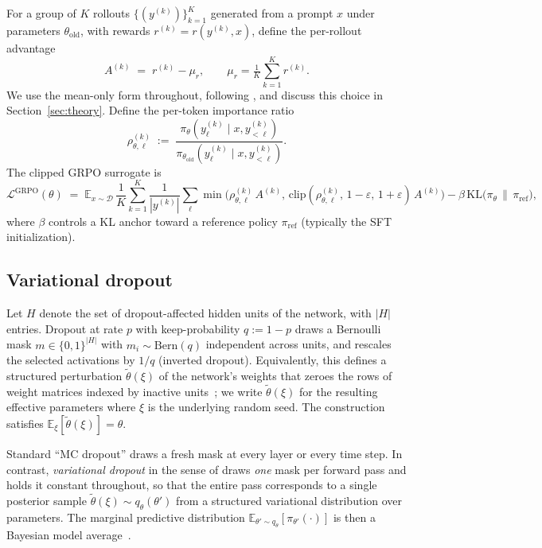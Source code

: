 \documentclass[11pt]{article}
\theoremstyle{definition}
\theoremstyle{remark}
\newcommand{\E}{\mathbb{E}}
\newcommand{\KL}{\mathrm{KL}}
\newcommand{\D}{\mathcal{D}}
\newcommand{\Loss}{\mathcal{L}}
\newcommand{\eps}{\varepsilon}
\newcommand{\old}{\mathrm{old}}
\begin{document}
For a group of $K$ rollouts $\{(y^{(k)})\}_{k=1}^K$ generated from a
prompt $x$ under parameters $\theta_\old$, with rewards
$r^{(k)} = r(y^{(k)}, x)$, define the per-rollout
advantage
\begin{equation}
A^{(k)} \;=\; r^{(k)} - \mu_r,
\qquad
\mu_r = \tfrac{1}{K}\sum_{k=1}^K r^{(k)}.
\label{eq:prelim-advantage}
\end{equation}
We use the mean-only form throughout, following
\citet{liu2024drgrpo}, and discuss this choice in
Section~\ref{sec:theory}.  Define the per-token importance ratio
\begin{equation}
\rho_{\theta,\ell}^{(k)}
   \;:=\;
\frac{\pi_\theta(y_\ell^{(k)} \mid x, y_{<\ell}^{(k)})}
     {\pi_{\theta_\old}(y_\ell^{(k)} \mid x, y_{<\ell}^{(k)})}.
\end{equation}
The clipped GRPO surrogate is
\begin{equation}
\Loss^{\mathrm{GRPO}}(\theta)
  \;=\;
\E_{x \sim \D}\,
\frac{1}{K}\sum_{k=1}^K \frac{1}{|y^{(k)}|} \sum_\ell
   \min\!\Big(
      \rho_{\theta,\ell}^{(k)}\, A^{(k)},\,
      \mathrm{clip}(\rho_{\theta,\ell}^{(k)},\,1-\eps,\,1+\eps)\,A^{(k)}
   \Big)
   - \beta\,\KL\!\big(\pi_\theta\,\big\|\,\pi_{\mathrm{ref}}\big),
\label{eq:prelim-grpo-loss}
\end{equation}
where $\beta$ controls a KL anchor toward a reference policy
$\pi_{\mathrm{ref}}$ (typically the SFT initialization).

\subsection{Variational dropout}
\label{sec:prelim-vdropout}

Let $H$ denote the set of dropout-affected hidden units of the
network, with $|H|$ entries.  Dropout at rate $p$ with keep-probability
$q := 1 - p$ draws a Bernoulli mask $m \in \{0, 1\}^{|H|}$ with
$m_i \sim \mathrm{Bern}(q)$ independent across units, and rescales the
selected activations by $1/q$ (inverted dropout).  Equivalently, this
defines a structured perturbation $\tilde\theta(\xi)$ of the network's
weights that zeroes the rows of weight matrices indexed by inactive
units~\citep{gal2016dropout}; we write $\tilde\theta(\xi)$ for the
resulting effective parameters where $\xi$ is the underlying random
seed.  The construction satisfies $\E_\xi[\tilde\theta(\xi)] = \theta$.

Standard ``MC dropout'' draws a fresh mask at every layer or every
time step.  In contrast, \emph{variational dropout} in the sense of
\citet{gal2016dropout} draws \emph{one} mask per forward pass and
holds it constant throughout, so that the entire pass corresponds to a
single posterior sample $\tilde\theta(\xi) \sim q_\theta(\theta')$
from a structured variational distribution over parameters.  The
marginal predictive distribution
$\E_{\theta' \sim q_\theta}[\pi_{\theta'}(\cdot)]$ is then a Bayesian
model average~\citep{gal2016dropout}.
\end{document}
